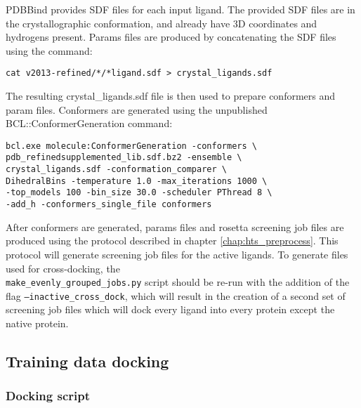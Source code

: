 PDBBind provides \ac{SDF} files for each input ligand.
The provided \ac{SDF} files are in the crystallographic conformation, and already have 3D coordinates and hydrogens present. 
Params files are produced by concatenating the \ac{SDF} files using the command:
\singlespace
\begin{Verbatim}
cat v2013-refined/*/*ligand.sdf > crystal_ligands.sdf
\end{Verbatim}
\doublespace
The resulting crystal\_ligands.sdf file is then used to prepare conformers and param files.
Conformers are generated using the unpublished BCL::ConformerGeneration command:
\singlespace
\begin{verbatim}
bcl.exe molecule:ConformerGeneration -conformers \
pdb_refinedsupplemented_lib.sdf.bz2 -ensemble \
crystal_ligands.sdf -conformation_comparer \
DihedralBins -temperature 1.0 -max_iterations 1000 \
-top_models 100 -bin_size 30.0 -scheduler PThread 8 \
-add_h -conformers_single_file conformers
\end{verbatim}
\doublespace
After conformers are generated, params files and rosetta screening job files are produced using the protocol described in chapter \ref{chap:hts_preprocess}.
This protocol will generate screening job files for the active ligands.
To generate files used for cross-docking, the\\
\texttt{make\_evenly\_grouped\_jobs.py} script should be re-run with the addition of the flag \texttt{--inactive\_cross\_dock}, which will result in the creation of a second set of screening job files which will dock every ligand into every protein except the native protein.

\subsection{Training data docking}

\subsubsection{Docking script}

